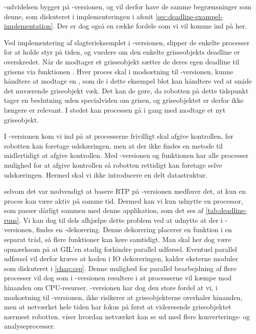 -udvidelsen bygger på -versionen, og vil derfor have de samme begrænsninger som denne, som diskuteret i implementeringen i afsnit \cref{sec:deadline-exampel-implementation}. Der er dog også en række fordele som vi vil komme ind på her.

Ved implementering af slagterieksemplet i -versionen, slipper de enkelte processer for at holde styr på tiden, og vurdere om den enkelte grisseobjekts deadline er overskredet. Når de modtager et grisseobjekt sætter de deres egen deadline til grisens via funktionen . Hver proces skal i modsætning til -versionen, kunne håndtere at modtage en , som de i dette eksempel blot kan håndtere ved at smide det nuværende griseobjekt væk. Det kan de gøre, da robotten på dette tidspunkt tager en beslutning uden specialviden om grisen, og griseobjektet er derfor ikke længere er relevant. I stedet kan processen  gå i gang med modtage et nyt griseobjekt.

I -versionen kom vi ind på at processerne frivilligt skal afgive kontrollen, før robotten kan foretage udskæringen, men at der ikke findes en metode til midlertidigt at afgive kontrollen. Med -versionen og funktionen  har alle processer mulighed for at afgive kontrollen så robotten rettidigt kan foretage selve udskæringen. Hermed skal vi ikke introducere en delt datastruktur.
  
selvom det var nødvendigt at basere RTP på  -versionen medfører det, at kun en proces kan være aktiv på samme tid. Dermed kan vi kun udnytte en processor, som  passer dårligt sammen med denne applikation, som det ses af \cref{tab:deadline-runs}.  Vi kan dog til dels afhjælpe dette problem ved at udnytte at der i -versionen, findes en -dekorering. Denne dekorering placerer en funktion i en separat tråd, så flere funktioner kan køre samtidigt. Man skal her dog være opmærksom på at GIL'en stadig forhindre parallel udførsel. Eventuel parallel udførsel vil derfor kræve at koden i IO dekoreringen, kalder eksterne moduler som diskuteret i \cref{chap:csp}. Denne mulighed for parallel bearbejdning af flere processer vil dog  som i -versionen resultere i at processerne vil kæmpe mod hinanden om CPU-resurser. -versionen har dog den store fordel at vi, i modsætning til -versionen, ikke risikerer at griseobjekterne overhaler hinanden, men at netværket hele tiden har fokus på først at videresende griseobjektet nærmest robotten.  viser hvordan netværket kan se ud med flere konverterings- og analyseprocesser.


